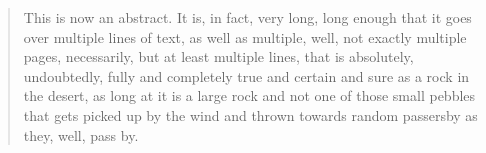 \begin{quote}
This is now an abstract. It is, in fact, very long, long enough that it goes over multiple lines of text, as well as multiple, well, not exactly multiple pages, necessarily, but at least multiple lines, that is absolutely, undoubtedly, fully and completely true and certain and sure as a rock in the desert, as long at it is a large rock and not one of those small pebbles that gets picked up by the wind and thrown towards random passersby as they, well, pass by.
\end{quote}